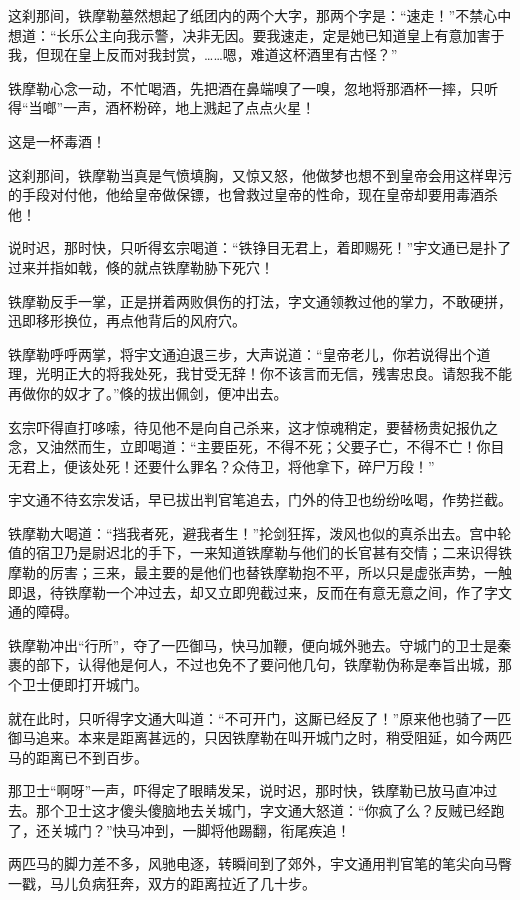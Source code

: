 \documentclass[12pt,oneside]{book}
\begin{document}
这刹那间，铁摩勒墓然想起了纸团内的两个大字，那两个字是：``速走！''不禁心中想道：``长乐公主向我示警，决非无因。要我速走，定是她已知道皇上有意加害于我，但现在皇上反而对我封赏，\ldots\ldots 嗯，难道这杯酒里有古怪？''

铁摩勒心念一动，不忙喝酒，先把酒在鼻端嗅了一嗅，忽地将那酒杯一摔，只听得``当啷''一声，酒杯粉碎，地上溅起了点点火星！

这是一杯毒酒！

这刹那间，铁摩勒当真是气愤填胸，又惊又怒，他做梦也想不到皇帝会用这样卑污的手段对付他，他给皇帝做保镖，也曾救过皇帝的性命，现在皇帝却要用毒酒杀他！

说时迟，那时快，只听得玄宗喝道：``铁铮目无君上，着即赐死！''宇文通已是扑了过来并指如戟，倏的就点铁摩勒胁下死穴！

铁摩勒反手一掌，正是拼着两败俱伤的打法，字文通领教过他的掌力，不敢硬拼，迅即移形换位，再点他背后的风府穴。

铁摩勒呼呼两掌，将宇文通迫退三步，大声说道：``皇帝老儿，你若说得出个道理，光明正大的将我处死，我甘受无辞！你不该言而无信，残害忠良。请恕我不能再做你的奴才了。''倏的拔出佩剑，便冲出去。

玄宗吓得直打哆嗦，待见他不是向自己杀来，这才惊魂稍定，要替杨贵妃报仇之念，又油然而生，立即喝道：``主要臣死，不得不死；父要子亡，不得不亡！你目无君上，便该处死！还要什么罪名？众侍卫，将他拿下，碎尸万段！''

宇文通不待玄宗发话，早已拔出判官笔追去，门外的侍卫也纷纷吆喝，作势拦截。

铁摩勒大喝道：``挡我者死，避我者生！''抡剑狂挥，泼风也似的真杀出去。宫中轮值的宿卫乃是尉迟北的手下，一来知道铁摩勒与他们的长官甚有交情；二来识得铁摩勒的厉害；三来，最主要的是他们也替铁摩勒抱不平，所以只是虚张声势，一触即退，待铁摩勒一个冲过去，却又立即兜截过来，反而在有意无意之间，作了字文通的障碍。

铁摩勒冲出``行所''，夺了一匹御马，快马加鞭，便向城外驰去。守城门的卫士是秦裹的部下，认得他是何人，不过也免不了要问他几句，铁摩勒伪称是奉旨出城，那个卫士便即打开城门。

就在此时，只听得字文通大叫道：``不可开门，这厮已经反了！''原来他也骑了一匹御马追来。本来是距离甚远的，只因铁摩勒在叫开城门之时，稍受阻延，如今两匹马的距离已不到百步。

那卫士``啊呀''一声，吓得定了眼睛发呆，说时迟，那时快，铁摩勒已放马直冲过去。那个卫士这才傻头傻脑地去关城门，字文通大怒道：``你疯了么？反贼已经跑了，还关城门？''快马冲到，一脚将他踢翻，衔尾疾追！

两匹马的脚力差不多，风驰电逐，转瞬间到了郊外，宇文通用判官笔的笔尖向马臀一戳，马儿负病狂奔，双方的距离拉近了几十步。
\end{document}
